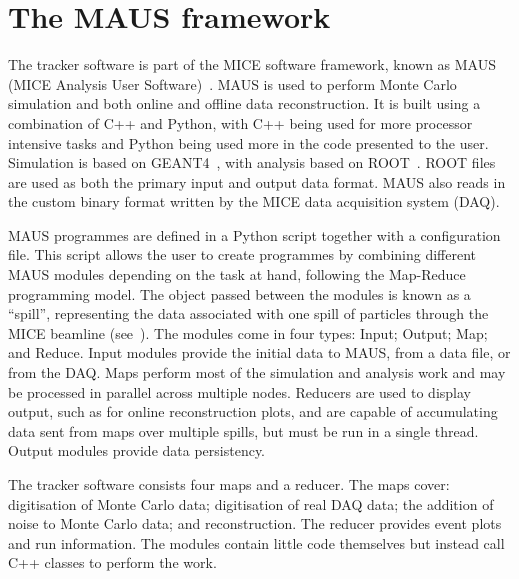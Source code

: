 \section{The MAUS framework}
\label{sec:MAUS}
The tracker software is part of the MICE software framework, known as MAUS (MICE Analysis User Software)~\cite{MausPaper}. MAUS is used to perform Monte Carlo simulation and both online and offline data reconstruction. It is built using a combination of C++ and Python, with C++ being used for more processor intensive tasks and Python being used more in the code presented to the user.  Simulation is based on GEANT4~\cite{GEANT4}, with analysis based on ROOT~\cite{ROOT}.  ROOT files are used as both the primary input and output data format. MAUS also reads in the custom binary format written by the MICE data acquisition system (DAQ). 

MAUS programmes are defined in a Python script together with a configuration file.  This script allows the user to create programmes by combining different MAUS modules depending on the task at hand, following the Map-Reduce programming model\cite{MapReduce}. The object passed between the modules is known as a ``spill'', representing the data associated with one spill of particles through the MICE beamline (see~\cite{MiceBeamline}).  The modules come in four types: Input; Output; Map; and Reduce.  Input modules provide the initial data to MAUS, from a data file, or from the DAQ. Maps perform most of the simulation and analysis work and may be processed in parallel across multiple nodes.  Reducers are used to display output, such as for online reconstruction plots, and are capable of accumulating data sent from maps over multiple spills, but must be run in a single thread. Output modules provide data persistency.

The tracker software consists four maps and a reducer. The maps cover: digitisation of Monte Carlo data; digitisation of real DAQ data; the addition of noise to Monte Carlo data; and reconstruction. The reducer provides event plots and run information.  The modules contain little code themselves but instead call C++ classes to perform the work.
